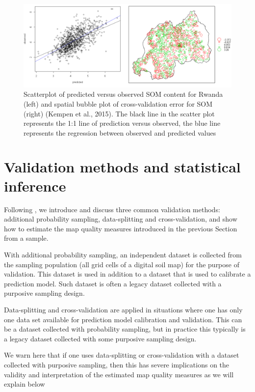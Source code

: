 \documentclass[10pt,b5paper,]{book}
\theoremstyle{definition}
\theoremstyle{definition}
\theoremstyle{definition}
\theoremstyle{remark}
\begin{document}
\begin{figure}
\includegraphics[width=0.8\linewidth]{images/Validation_Rwanda} \caption{Scatterplot of predicted versus observed SOM content for Rwanda (left) and spatial bubble plot of cross-validation error for SOM (right) (Kempen et al., 2015). The black line in the scatter plot represents the 1:1 line of prediction versus observed, the blue line represents the regression between observed and predicted values}\label{fig:rwandaval}
\end{figure}

\hypertarget{validationMeth}{%
\section{Validation methods and statistical
inference}\label{validationMeth}}

Following \citet{brus2011sampling}, we introduce and discuss three
common validation methods: additional probability sampling,
data-splitting and cross-validation, and show how to estimate the map
quality measures introduced in the previous Section from a sample.

With additional probability sampling, an independent dataset is
collected from the sampling population (all grid cells of a digital soil
map) for the purpose of validation. This dataset is used in addition to
a dataset that is used to calibrate a prediction model. Such dataset is
often a legacy dataset collected with a purposive sampling design.

Data-splitting and cross-validation are applied in situations where one
has only one data set available for prediction model calibration and
validation. This can be a dataset collected with probability sampling,
but in practice this typically is a legacy dataset collected with some
purposive sampling design.

We warn here that if one uses data-splitting or cross-validation with a
dataset collected with purposive sampling, then this has severe
implications on the validity and interpretation of the estimated map
quality measures as we will explain below
\end{document}
